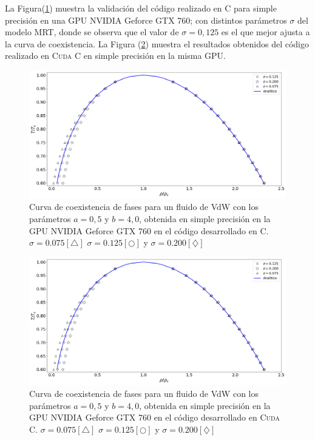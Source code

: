 La Figura(\ref{fig:v_760_MxC_c_simple}) muestra la validación del código realizado en \textsc{C} para simple precisión en una GPU NVIDIA Geforce GTX 760; con distintos parámetros $\sigma$ del modelo MRT, donde se observa que el valor de $\sigma = 0,125$ es el que mejor ajusta a la curva de coexistencia. La Figura (\ref{fig:v_760_MxC_cuda_simple}) muestra el resultados obtenidos del código realizado en \textsc{Cuda C} en simple precisión en la misma GPU.

\begin{figure}[htbp]
	\centering
	\includegraphics[width=\textwidth]{figs/cap4/v_760_MxC_c_simple}
	\caption{Curva de coexistencia de fases para un fluido de VdW con los parámetros $a = 0,5 $ y $b = 4,0 $, obtenida en simple precisión en la GPU NVIDIA Geforce GTX 760 en el código desarrollado en \textsc{C}. $\sigma = 0.075[\bigtriangleup]$	 $\sigma = 0.125[\bigcirc]$ y $\sigma = 0.200[\diamondsuit]$ }
 	\label{fig:v_760_MxC_c_simple}	
\end{figure}

\begin{figure}[htbp]
	\centering
	\includegraphics[width=\textwidth]{figs/cap4/v_760_MxC_cuda_simple}
	\caption{Curva de coexistencia de fases para un fluido de VdW con los parámetros $a = 0,5 $ y $b = 4,0 $, obtenida en simple precisión en la GPU NVIDIA Geforce GTX 760 en el código desarrollado en \textsc{Cuda C}. $\sigma = 0.075[\bigtriangleup]$	 $\sigma = 0.125[\bigcirc]$ y $\sigma = 0.200[\diamondsuit]$ }
	\label{fig:v_760_MxC_cuda_simple}	
\end{figure}

